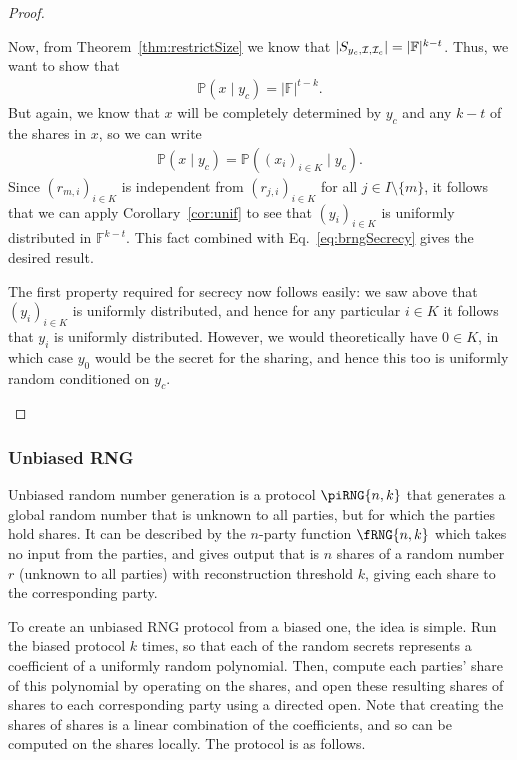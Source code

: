 \documentclass{article}
\theoremstyle{remark}
\newcommand{\F}{\mathbb{F}}
\renewcommand{\P}{\mathbb{P}}
\begin{document}
\begin{proof}
\begin{itemize}
			Now, from Theorem~\ref{thm:restrictSize} we know that
			$|\shareRestrict{y_c}{\mathcal{I}}{\mathcal{I}_c}| = |\F|^{k-t}$.
			Thus, we want to show that
			\begin{align*}
				\P(x \mid y_c) = |\F|^{t-k}.
			\end{align*}
			But again, we know that $x$ will be completely determined by $y_c$
			and any $k-t$ of the shares in $x$, so we can write
			\begin{align}\label{eq:brngSecrecy}
				\P(x \mid y_c) = \P({(x_i)}_{i \in K} \mid y_c).
			\end{align}
			Since ${(r_{m, i})}_{i \in K}$ is independent from ${(r_{j, i})}_{i
			\in K}$ for all $j \in I \setminus \{m\}$, it follows that we can
			apply Corollary~\ref{cor:unif} to see that ${(y_i)}_{i \in K}$ is
			uniformly distributed in $\F^{k-t}$. This fact combined with
			Eq.~\eqref{eq:brngSecrecy} gives the desired result.

			The first property required for secrecy now follows easily: we saw
			above that ${(y_i)}_{i \in K}$ is uniformly distributed, and hence
			for any particular $i \in K$ it follows that $y_i$ is uniformly
			distributed. However, we would theoretically have $0 \in K$, in
			which case $y_0$ would be the secret for the sharing, and hence
			this too is uniformly random conditioned on $y_c$.
	\end{itemize}
\end{proof}

\subsubsection{Unbiased RNG}

Unbiased random number generation is a protocol $\piRNG{n,k}$ that generates a
global random number that is unknown to all parties, but for which the parties
hold shares. It can be described by the $n$-party function $\fRNG{n,k}$ which
takes no input from the parties, and gives output that is $n$ shares of a
random number $r$ (unknown to all parties) with reconstruction threshold $k$,
giving each share to the corresponding party.

To create an unbiased RNG protocol from a biased one, the idea is simple. Run
the biased protocol $k$ times, so that each of the random secrets represents a
coefficient of a uniformly random polynomial. Then, compute each parties' share
of this polynomial by operating on the shares, and open these resulting shares
of shares to each corresponding party using a directed open. Note that creating
the shares of shares is a linear combination of the coefficients, and so can be
computed on the shares locally. The protocol is as follows.
\end{document}
